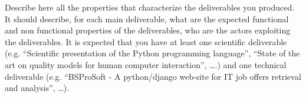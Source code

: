 {\color{gray}

Describe here all the properties that characterize the deliverables
you produced. It should describe, for each main deliverable, what are
the expected functional and non functional properties of the
deliverables, who are the actors exploiting the deliverables. It is
expected that you have at least one scientific deliverable (e.g.
``Scientific presentation of the Python programming language'',
``State of the art on quality models for human computer interaction'',
\ldots.) and one technical deliverable (e.g. ``BSProSoft - A
python/django web-site for IT job offers retrieval and analysis'',
\ldots). 

}
